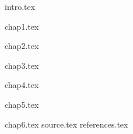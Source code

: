 \documentclass[12pt,a4paper, twoside]{article}
\begin{document}
 \newpage

\onehalfspacing
\tableofcontents
\thispagestyle{empty}
\newpage
{}
\setcounter{page}{1}
\fancyhead{}
\renewcommand{\footruleskip}{10pt}
\renewcommand{\footrulewidth}{1pt}
\renewcommand{\headrulewidth}{1pt}
\fancyfoot{}
\newpage
{intro.tex}

{chap1.tex}

{chap2.tex}

{chap3.tex}

{chap4.tex}

{chap5.tex}

{chap6.tex}
\newpage
{source.tex}
\newpage
{references.tex}
\end{document}
